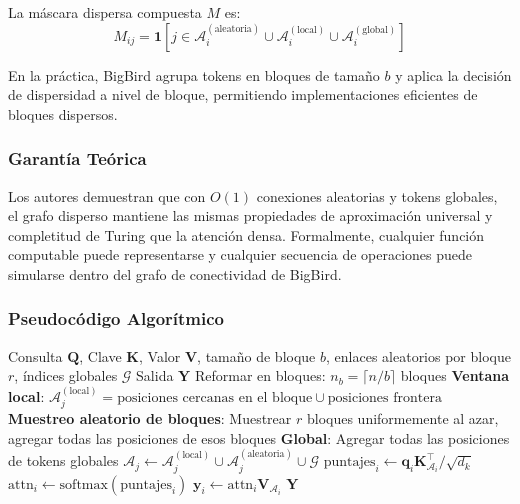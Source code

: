 La máscara dispersa compuesta $M$ es:
\[
M_{ij} = \mathbf{1}[j \in \mathcal{A}_i^{(\text{aleatoria})} \cup \mathcal{A}_i^{(\text{local})} \cup \mathcal{A}_i^{(\text{global})}]
\]

En la práctica, BigBird agrupa tokens en bloques de tamaño $b$ y aplica la decisión de dispersidad a nivel de bloque, permitiendo implementaciones eficientes de bloques dispersos.

\subsubsection{Garantía Teórica}

Los autores demuestran que con $O(1)$ conexiones aleatorias y tokens globales, el grafo disperso mantiene las mismas propiedades de aproximación universal y completitud de Turing que la atención densa. Formalmente, cualquier función computable puede representarse y cualquier secuencia de operaciones puede simularse dentro del grafo de conectividad de BigBird.

\subsubsection{Pseudocódigo Algorítmico}

\begin{algorithm}[H]
\caption{BigBird: Atención Dispersa por Bloques Aleatoria + Local + Global}
\begin{algorithmic}[1]
\Require Consulta $\mathbf{Q}$, Clave $\mathbf{K}$, Valor $\mathbf{V}$, tamaño de bloque $b$, enlaces aleatorios por bloque $r$, índices globales $\mathcal{G}$
\Ensure Salida $\mathbf{Y}$
\State Reformar en bloques: $n_b = \lceil n / b \rceil$ bloques
        \State \textbf{Ventana local}: $\mathcal{A}_j^{(\text{local})} = \text{posiciones cercanas en el bloque} \cup \text{posiciones frontera}$
        \State \textbf{Muestreo aleatorio de bloques}: Muestrear $r$ bloques uniformemente al azar, agregar todas las posiciones de esos bloques
        \State \textbf{Global}: Agregar todas las posiciones de tokens globales
        \State $\mathcal{A}_j \gets \mathcal{A}_j^{(\text{local})} \cup \mathcal{A}_j^{(\text{aleatoria})} \cup \mathcal{G}$
    \EndFor
\EndFor
{}
    \State $\text{puntajes}_i \gets \mathbf{q}_i \mathbf{K}_{\mathcal{A}_i}^\top / \sqrt{d_k}$
    \State $\text{attn}_i \gets \text{softmax}(\text{puntajes}_i)$
    \State $\mathbf{y}_i \gets \text{attn}_i \mathbf{V}_{\mathcal{A}_i}$
\EndFor
\Return $\mathbf{Y}$
\end{algorithmic}
\end{algorithm}

